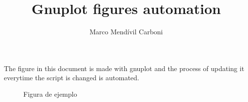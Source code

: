 \documentclass[a4paper,11pt]{article}
\title{Gnuplot figures automation}
\author{Marco Mendívil Carboni}
\begin{document}
\maketitle

The figure in this document is made with {\ttfamily gnuplot} and the process of updating it everytime the script is changed is automated.

\begin{figure}[h]
    \centering
    
    \caption{Figura de ejemplo}
\end{figure}
\end{document}
